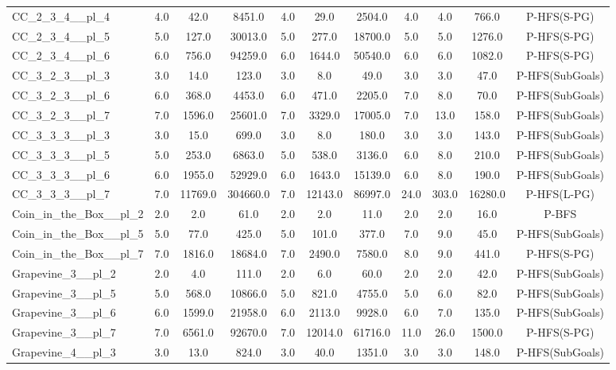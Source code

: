 \begin{table}[!ht]
\begin{tabular}{l|ccc|ccc|cccc}
CC\_2\_3\_4\_\_pl\_4 & 4.0 & 42.0 & 8451.0 & 4.0 & 29.0 & 2504.0 & 4.0 & 4.0 & 766.0 & P-HFS(S-PG) \\
CC\_2\_3\_4\_\_pl\_5 & 5.0 & 127.0 & 30013.0 & 5.0 & 277.0 & 18700.0 & 5.0 & 5.0 & 1276.0 & P-HFS(S-PG) \\
CC\_2\_3\_4\_\_pl\_6 & 6.0 & 756.0 & 94259.0 & 6.0 & 1644.0 & 50540.0 & 6.0 & 6.0 & 1082.0 & P-HFS(S-PG) \\
CC\_3\_2\_3\_\_pl\_3 & 3.0 & 14.0 & 123.0 & 3.0 & 8.0 & 49.0 & 3.0 & 3.0 & 47.0 & P-HFS(SubGoals) \\
CC\_3\_2\_3\_\_pl\_6 & 6.0 & 368.0 & 4453.0 & 6.0 & 471.0 & 2205.0 & 7.0 & 8.0 & 70.0 & P-HFS(SubGoals) \\
CC\_3\_2\_3\_\_pl\_7 & 7.0 & 1596.0 & 25601.0 & 7.0 & 3329.0 & 17005.0 & 7.0 & 13.0 & 158.0 & P-HFS(SubGoals) \\
CC\_3\_3\_3\_\_pl\_3 & 3.0 & 15.0 & 699.0 & 3.0 & 8.0 & 180.0 & 3.0 & 3.0 & 143.0 & P-HFS(SubGoals) \\
CC\_3\_3\_3\_\_pl\_5 & 5.0 & 253.0 & 6863.0 & 5.0 & 538.0 & 3136.0 & 6.0 & 8.0 & 210.0 & P-HFS(SubGoals) \\
CC\_3\_3\_3\_\_pl\_6 & 6.0 & 1955.0 & 52929.0 & 6.0 & 1643.0 & 15139.0 & 6.0 & 8.0 & 190.0 & P-HFS(SubGoals) \\
CC\_3\_3\_3\_\_pl\_7 & 7.0 & 11769.0 & 304660.0 & 7.0 & 12143.0 & 86997.0 & 24.0 & 303.0 & 16280.0 & P-HFS(L-PG) \\
Coin\_in\_the\_Box\_\_pl\_2 & 2.0 & 2.0 & 61.0 & 2.0 & 2.0 & 11.0 & 2.0 & 2.0 & 16.0 & P-BFS \\
Coin\_in\_the\_Box\_\_pl\_5 & 5.0 & 77.0 & 425.0 & 5.0 & 101.0 & 377.0 & 7.0 & 9.0 & 45.0 & P-HFS(SubGoals) \\
Coin\_in\_the\_Box\_\_pl\_7 & 7.0 & 1816.0 & 18684.0 & 7.0 & 2490.0 & 7580.0 & 8.0 & 9.0 & 441.0 & P-HFS(S-PG) \\
Grapevine\_3\_\_pl\_2 & 2.0 & 4.0 & 111.0 & 2.0 & 6.0 & 60.0 & 2.0 & 2.0 & 42.0 & P-HFS(SubGoals) \\
Grapevine\_3\_\_pl\_5 & 5.0 & 568.0 & 10866.0 & 5.0 & 821.0 & 4755.0 & 5.0 & 6.0 & 82.0 & P-HFS(SubGoals) \\
Grapevine\_3\_\_pl\_6 & 6.0 & 1599.0 & 21958.0 & 6.0 & 2113.0 & 9928.0 & 6.0 & 7.0 & 135.0 & P-HFS(SubGoals) \\
Grapevine\_3\_\_pl\_7 & 7.0 & 6561.0 & 92670.0 & 7.0 & 12014.0 & 61716.0 & 11.0 & 26.0 & 1500.0 & P-HFS(S-PG) \\
Grapevine\_4\_\_pl\_3 & 3.0 & 13.0 & 824.0 & 3.0 & 40.0 & 1351.0 & 3.0 & 3.0 & 148.0 & P-HFS(SubGoals) \\

\end{tabular}
\end{table}
